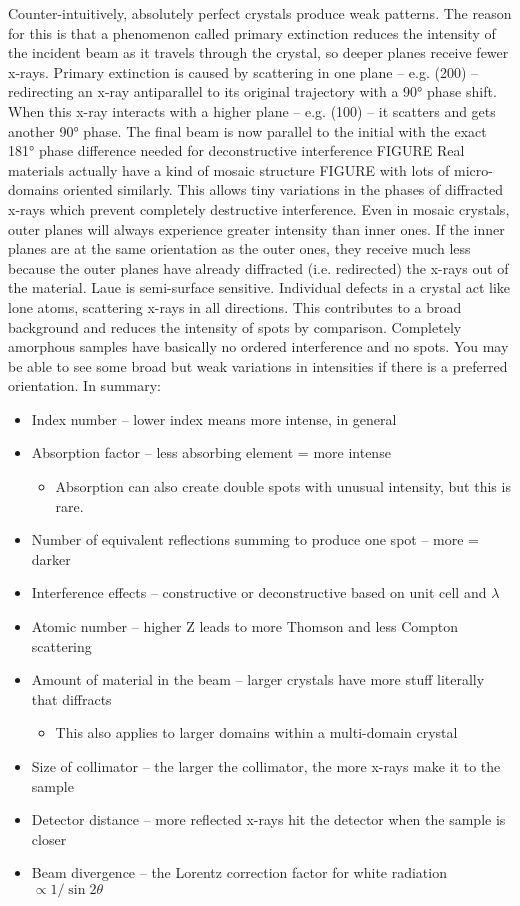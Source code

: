 Counter-intuitively, absolutely perfect crystals produce weak patterns. The reason for this is that a phenomenon called primary extinction reduces the intensity of the incident beam as it travels through the crystal, so deeper planes receive fewer x-rays. Primary extinction is caused by scattering in one plane – e.g. (200) – redirecting an x-ray antiparallel to its original trajectory with a \ang{90} phase shift. When this x-ray interacts with a higher plane – e.g. (100) – it scatters and gets another \ang{90} phase. The final beam is now parallel to the initial with the exact \ang{181} phase difference needed for deconstructive interference FIGURE
Real materials actually have a kind of mosaic structure FIGURE with lots of micro-domains oriented similarly. This allows tiny variations in the phases of diffracted x-rays which prevent completely destructive interference.
Even in mosaic crystals, outer planes will always experience greater intensity than inner ones. If the inner planes are at the same orientation as the outer ones, they receive much less because the outer planes have already diffracted (i.e. redirected) the x-rays out of the material. Laue is semi-surface sensitive.
Individual defects in a crystal act like lone atoms, scattering x-rays in all directions. This contributes to a broad background and reduces the intensity of spots by comparison. Completely amorphous samples have basically no ordered interference and no spots. You may be able to see some broad but weak variations in intensities if there is a preferred orientation.
In summary:
\begin{itemize}
    \item Index number – lower index means more intense, in general
    \item Absorption factor – less absorbing element = more intense
    \begin{itemize}
        \item Absorption can also create double spots with unusual intensity, but this is rare.
        \end{itemize}
    \item Number of equivalent reflections summing to produce one spot – more = darker
    \item Interference effects – constructive or deconstructive based on unit cell and $\lambda$
    \item Atomic number – higher Z leads to more Thomson and less Compton scattering
    \item Amount of material in the beam – larger crystals have more stuff literally that diffracts
    \begin{itemize}
        \item This also applies to larger domains within a multi-domain crystal
        \end{itemize}
    \item Size of collimator – the larger the collimator, the more x-rays make it to the sample
    \item Detector distance – more reflected x-rays hit the detector when the sample is closer
    \item Beam divergence – the Lorentz correction factor for white radiation $\propto 1/\sin{2\theta}$
\end{itemize}

